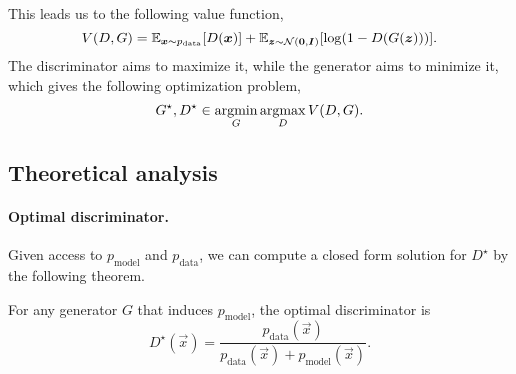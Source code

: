This leads us to the following value function, \[
    V(D,G) = \mathbb{E}_{\bm{x} \sim p_{\mathrm{data}}} [D(\bm{x})] + \mathbb{E}_{\bm{z} \sim \mathcal{N}(\bm{0}, \bm{I})} [\log (1 - D(G(\bm{z})))].
\]
The discriminator aims to maximize it, while the generator aims to minimize it, which gives the
following optimization problem, \[
    G^\star, D^\star \in \operatorname*{argmin}_G \operatorname*{argmax}_D V(D,G).
\]

\subsection{Theoretical analysis}

\paragraph{Optimal discriminator.}

Given access to $p_{\mathrm{model}}$ and $p_{\mathrm{data}}$, we can compute a closed form solution
for $D^\star$ by the following theorem.

\begin{theorem}
    For any generator $G$ that induces $p_{\mathrm{model}}$, the optimal discriminator is \[
        D^\star(\vec{x}) = \frac{p_{\mathrm{data}}(\vec{x})}{p_{\mathrm{data}}(\vec{x}) + p_{\mathrm{model}}(\vec{x})}.
    \]
\end{theorem}

